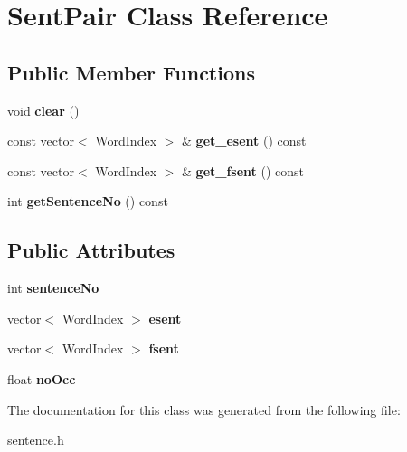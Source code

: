 \hypertarget{classSentPair}{\section{\-Sent\-Pair \-Class \-Reference}
\label{classSentPair}
}
\subsection*{\-Public \-Member \-Functions}
\begin{DoxyCompactItemize}
\item 
\hypertarget{classSentPair_a1dbae90ad901e687c8812b21d78286df}{void {\bfseries clear} ()}\label{classSentPair_a1dbae90ad901e687c8812b21d78286df}

\item 
\hypertarget{classSentPair_af866f629b6e163bbe0ab119864c4f3d4}{const vector$<$ \-Word\-Index $>$ \& {\bfseries get\-\_\-esent} () const }\label{classSentPair_af866f629b6e163bbe0ab119864c4f3d4}

\item 
\hypertarget{classSentPair_a9e7546a4f7dd985171f806f0cc7ce647}{const vector$<$ \-Word\-Index $>$ \& {\bfseries get\-\_\-fsent} () const }\label{classSentPair_a9e7546a4f7dd985171f806f0cc7ce647}

\item 
\hypertarget{classSentPair_ae2c7d97952617a566743226960983660}{int {\bfseries get\-Sentence\-No} () const }\label{classSentPair_ae2c7d97952617a566743226960983660}

\end{DoxyCompactItemize}
\subsection*{\-Public \-Attributes}
\begin{DoxyCompactItemize}
\item 
\hypertarget{classSentPair_aa36d89468b68471cfe024f199312b589}{int {\bfseries sentence\-No}}\label{classSentPair_aa36d89468b68471cfe024f199312b589}

\item 
\hypertarget{classSentPair_a829c8b5c3b3e34f665f7eb22b6b35c96}{vector$<$ \-Word\-Index $>$ {\bfseries esent}}\label{classSentPair_a829c8b5c3b3e34f665f7eb22b6b35c96}

\item 
\hypertarget{classSentPair_a32bc8d1e9f19af97867d04f4efda28c9}{vector$<$ \-Word\-Index $>$ {\bfseries fsent}}\label{classSentPair_a32bc8d1e9f19af97867d04f4efda28c9}

\item 
\hypertarget{classSentPair_abc4fe794314399afc8760886a82d7550}{float {\bfseries no\-Occ}}\label{classSentPair_abc4fe794314399afc8760886a82d7550}

\end{DoxyCompactItemize}


\-The documentation for this class was generated from the following file\-:\begin{DoxyCompactItemize}
\item 
sentence.\-h\end{DoxyCompactItemize}
